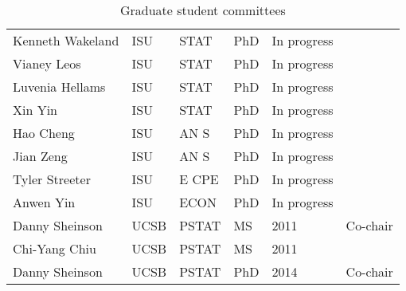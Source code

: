 \begin{table}[h]
\begin{tabular}{llllll}
  Kenneth Wakeland & ISU & STAT & PhD & In progress &  \\ 
  Vianey Leos & ISU & STAT & PhD & In progress &  \\ 
  Luvenia Hellams & ISU & STAT & PhD & In progress &  \\ 
  Xin Yin & ISU & STAT & PhD & In progress &  \\ 
  Hao Cheng & ISU & AN S & PhD & In progress &  \\ 
  Jian Zeng & ISU & AN S & PhD & In progress &  \\ 
  Tyler Streeter & ISU & E CPE & PhD & In progress &  \\ 
  Anwen Yin & ISU & ECON & PhD & In progress &  \\ 
  Danny Sheinson & UCSB & PSTAT & MS & 2011 & Co-chair \\ 
  Chi-Yang Chiu & UCSB & PSTAT & MS & 2011 &  \\ 
  Danny Sheinson & UCSB & PSTAT & PhD & 2014 & Co-chair \\ 
   \hline
\end{tabular}
\caption{Graduate student committees} 
\label{tab:studentcommittees}
\end{table}
